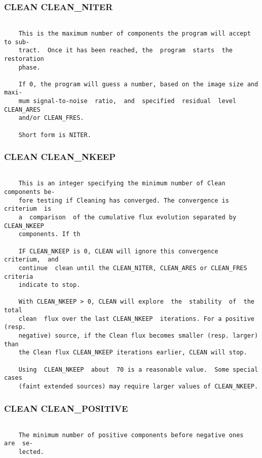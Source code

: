 \subsubsection{CLEAN CLEAN\_NITER}
\begin{verbatim}

    This is the maximum number of components the program will accept to sub-
    tract.  Once it has been reached, the  program  starts  the  restoration
    phase.

    If 0, the program will guess a number, based on the image size and maxi-
    mum signal-to-noise  ratio,  and  specified  residual  level  CLEAN_ARES
    and/or CLEAN_FRES.

    Short form is NITER.

\end{verbatim}
\subsubsection{CLEAN CLEAN\_NKEEP}
\begin{verbatim}

    This is an integer specifying the minimum number of Clean components be-
    fore testing if Cleaning has converged. The convergence is criterium  is
    a  comparison  of the cumulative flux evolution separated by CLEAN_NKEEP
    components. If th

    IF CLEAN_NKEEP is 0, CLEAN will ignore this convergence  criterium,  and
    continue  clean until the CLEAN_NITER, CLEAN_ARES or CLEAN_FRES criteria
    indicate to stop.

    With CLEAN_NKEEP > 0, CLEAN will explore  the  stability  of  the  total
    clean  flux over the last CLEAN_NKEEP  iterations. For a positive (resp.
    negative) source, if the Clean flux becomes smaller (resp. larger)  than
    the Clean flux CLEAN_NKEEP iterations earlier, CLEAN will stop.

    Using  CLEAN_NKEEP  about  70 is a reasonable value.  Some special cases
    (faint extended sources) may require larger values of CLEAN_NKEEP.

\end{verbatim}
\subsubsection{CLEAN CLEAN\_POSITIVE}
\begin{verbatim}

    The minimum number of positive components before negative ones  are  se-
    lected.

\end{verbatim}
